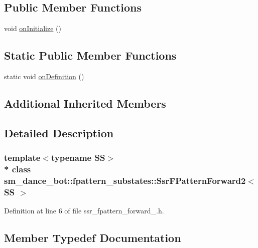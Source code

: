 \subsection*{Public Member Functions}
\begin{DoxyCompactItemize}
\item 
void \hyperlink{structsm__dance__bot_1_1fpattern__substates_1_1SsrFPatternForward2_a1fe0c6219cd97a1fd00bd2d88a4462ae}{on\+Initialize} ()
\end{DoxyCompactItemize}
\subsection*{Static Public Member Functions}
\begin{DoxyCompactItemize}
\item 
static void \hyperlink{structsm__dance__bot_1_1fpattern__substates_1_1SsrFPatternForward2_a903610f1d4d5c6c71eb93c8d5e1c3e76}{on\+Definition} ()
\end{DoxyCompactItemize}
\subsection*{Additional Inherited Members}


\subsection{Detailed Description}
\subsubsection*{template$<$typename SS$>$\\*
class sm\+\_\+dance\+\_\+bot\+::fpattern\+\_\+substates\+::\+Ssr\+F\+Pattern\+Forward2$<$ S\+S $>$}



Definition at line 6 of file ssr\+\_\+fpattern\+\_\+forward\+\_.\+h.



\subsection{Member Typedef Documentation}
